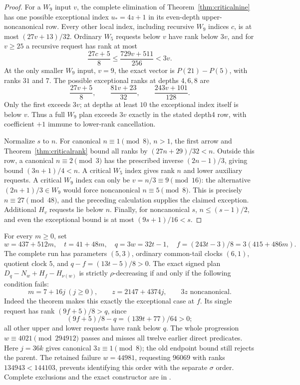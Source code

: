 \documentclass[11pt]{article}
\begin{document}
\begin{proof}
For a $W_9$ input $v$, the complete elimination of
Theorem~\ref{thm:criticalnine} has one possible exceptional index
$u_*=4z+1$ in its even-depth upper-noncanonical row. Every other local
index, including recursive $W_9$ indices $c$, is at most
$(27v+13)/32$. Ordinary $W_5$ requests below $v$ have rank below $3v$,
and for $v\ge25$ a recursive request has rank at most
\[
 \frac{27c+5}{8}\le\frac{729v+511}{256}<3v.
\]
At the only smaller $W_9$ input, $v=9$, the exact vector is
$P(21)-P(5)$, with ranks $31$ and $7$. The possible exceptional ranks
at depths $4,6,8$ are
\[
 \frac{27v+5}{8},\qquad\frac{81v+23}{32},\qquad
 \frac{243v+101}{128}.
\]
Only the first exceeds $3v$; at depths at least $10$ the exceptional
index itself is below $v$. Thus a full $W_9$ plan exceeds $3v$ exactly
in the stated depth4 row, with coefficient $+1$ immune to lower-rank
cancellation.

Normalize $s$ to $n$. For canonical $n\equiv1\pmod8$, $n>1$, the
first arrow and Theorem~\ref{thm:criticalrank} bound all ranks by
$(27n+29)/32<n$. Outside this row, a canonical $n\equiv2\pmod3$
has the prescribed inverse $(2n-1)/3$, giving bound $(3n+1)/4<n$.
A critical $W_5$ index gives rank $n$ and lower auxiliary requests.
A critical $W_9$ index can only be $v=n/3\equiv9\pmod{16}$:
the alternative $(2n+1)/3\in W_9$ would force noncanonical
$n\equiv5\pmod8$. This is precisely $n\equiv27\pmod{48}$,
and the preceding calculation supplies the claimed exception. Additional
$H_v$ requests lie below $n$. Finally, for noncanonical $s$,
$n\le(s-1)/2$, and even the exceptional bound is at most
$(9s+1)/16<s$.
\end{proof}

For every $m\ge0$, set
\[
 w=437+512m,\quad t=41+48m,\quad q=3w=32t-1,
 \quad f=(243t-3)/8=3(415+486m).
\]
The complete run has parameters $(5,3)$, ordinary common-tail clocks
$(6,1)$, quotient clock $5$, and $q-f=(13t-5)/8>0$.
The exact signed plan $D_q-N_w+H_f-H_{\nu(w)}$ is strictly
$\rho$-decreasing if and only if the following condition fails:
\[
 m=7+16j\ (j\ge0),\qquad z=2147+4374j,
 \qquad 3z\text{ noncanonical}.
\]
Indeed the theorem makes this exactly the exceptional case at $f$.
Its single request has rank $(9f+5)/8>q$, since
\[
 (9f+5)/8-q=(139t+77)/64>0;
\]
all other upper and lower requests have rank below $q$.
The whole progression $w\equiv4021\pmod{294912}$ passes and misses
all twelve earlier direct predicates. Here $j=36k$ gives canonical
$3z\equiv1\pmod8$; the old endpoint bound still rejects the parent.
The retained failure $w=44981$, requesting $96069$ with ranks
$134943<144103$, prevents identifying this order with the separate
$\sigma$ order. Complete exclusions and the exact constructor are in
.
\end{document}
